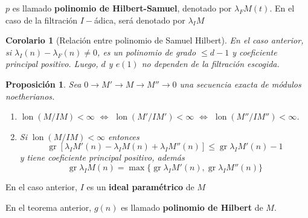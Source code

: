 \documentclass[12pt]{book}
\newtheorem{teo}{Teorema}
\newtheorem{pro}{Proposición}
\newtheorem{cor}{Corolario}
\newcommand{\lon}{\operatorname{lon}}
\newcommand{\gr}{\operatorname{gr}}
\newcommand{\seq}{0\rightarrow M' \rightarrow M \rightarrow M'' \rightarrow 0}
\begin{document}
$p$ es llamado \textbf{polinomio de Hilbert-Samuel}, denotado por $\lambda_F M (t) $. En el caso de la filtración $I-$ádica, será denotado por $\lambda_I M $

\begin{cor}[Relación entre polinomio de Samuel Hilbert]
En el caso anterior, si $ \lambda_I (n) - \lambda_F (n) \neq0 $, es un polinomio de grado $\leq d-1$ y coeficiente principal positivo. Luego, $d$ y $e(1)$ no dependen de la filtración escogida.
\end{cor}

\begin{pro}
Sea $\seq$ una secuencia exacta de módulos noetherianos.
\begin{enumerate}
\item $ \lon (M/IM) < \infty $ $\Longleftrightarrow$ $ \lon (M'/IM') < \infty $ $\Longleftrightarrow$ $ \lon (M''/IM'') < \infty $.
\item Si $ \lon (M/IM) < \infty$ entonces $$ \gr [ \lambda_I M' (n) - \lambda_I M (n) + \lambda_I M'' (n) ] \leq \gr \lambda_I M' (n) -1 $$ y tiene coeficiente principal positivo, además $$ \gr \lambda_I M  (n) =  \max \{ \gr \lambda_I M' (n) , \gr \lambda_I M'' (n)  \} $$  

\end{enumerate}
\end{pro}


En el caso anterior, $I$ es un \textbf{ideal paramétrico} de $M$


En el teorema anterior, $g(n)$ es llamado \textbf{polinomio de Hilbert} de $M$.
\end{document}
